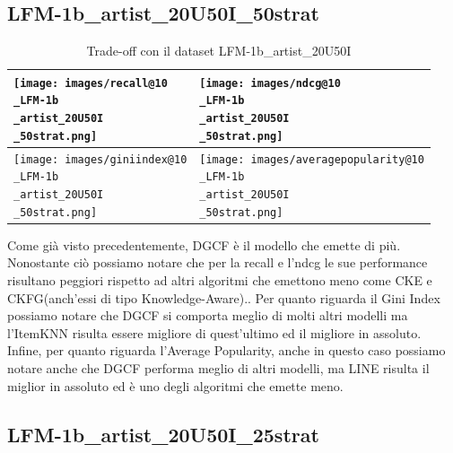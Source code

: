 \subsection{LFM-1b\_artist\_20U50I\_50strat}


\begin{table}[H]
    \centering
    \footnotesize
    \setlength\tabcolsep{0pt}
    \begin{tabularx}{\textwidth}{|X|X|}
        \hline
        \texttt{[image: images/recall@10\\\_LFM-1b\\\_artist\_20U50I\\\_50strat.png]} &
        \texttt{[image: images/ndcg@10\\\_LFM-1b\\\_artist\_20U50I\\\_50strat.png]} \\
        \hline
        \texttt{[image: images/giniindex@10\\\_LFM-1b\\\_artist\_20U50I\\\_50strat.png]} &
        \texttt{[image: images/averagepopularity@10\\\_LFM-1b\\\_artist\_20U50I\\\_50strat.png]} \\
        \hline
    \end{tabularx}
    \caption{Trade-off con il dataset LFM-1b\_artist\_20U50I}
    \label{tab:emissions_info}
\end{table}


\noindent Come già visto precedentemente, DGCF è il modello che emette di più. Nonostante ciò possiamo notare che per la recall e l'ndcg le sue performance risultano peggiori rispetto ad altri algoritmi che emettono meno come CKE e CKFG(anch'essi di tipo Knowledge-Aware)..
Per quanto riguarda il Gini Index possiamo notare che DGCF si comporta meglio di molti altri modelli ma l'ItemKNN risulta essere migliore di quest'ultimo ed il migliore in assoluto.
Infine, per quanto riguarda l'Average Popularity, anche in questo caso possiamo notare anche che DGCF performa meglio di altri modelli, ma LINE risulta il miglior in assoluto ed è uno degli algoritmi che emette meno.



\subsection{LFM-1b\_artist\_20U50I\_25strat}


